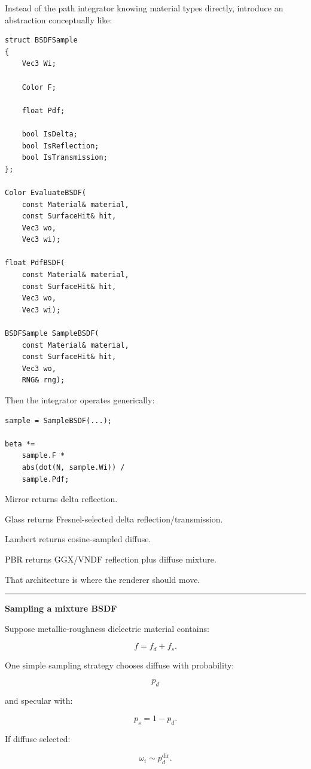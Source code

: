 Instead of the path integrator knowing material types directly, introduce an abstraction conceptually like:

\begin{verbatim}
struct BSDFSample
{
    Vec3 Wi;

    Color F;

    float Pdf;

    bool IsDelta;
    bool IsReflection;
    bool IsTransmission;
};

Color EvaluateBSDF(
    const Material& material,
    const SurfaceHit& hit,
    Vec3 wo,
    Vec3 wi);

float PdfBSDF(
    const Material& material,
    const SurfaceHit& hit,
    Vec3 wo,
    Vec3 wi);

BSDFSample SampleBSDF(
    const Material& material,
    const SurfaceHit& hit,
    Vec3 wo,
    RNG& rng);
\end{verbatim}

Then the integrator operates generically:

\begin{verbatim}
sample = SampleBSDF(...);

beta *=
    sample.F *
    abs(dot(N, sample.Wi)) /
    sample.Pdf;
\end{verbatim}

Mirror returns delta reflection.

Glass returns Fresnel-selected delta reflection/transmission.

Lambert returns cosine-sampled diffuse.

PBR returns GGX/VNDF reflection plus diffuse mixture.

That architecture is where the renderer should move.

\begin{center}\rule{0.5\linewidth}{0.5pt}\end{center}

\textbf{Sampling a mixture BSDF}

Suppose metallic-roughness dielectric material contains:

\[
f=
f_d+f_s.
\]

One simple sampling strategy chooses diffuse with probability:

\[
p_d
\]

and specular with:

\[
p_s=1-p_d.
\]

If diffuse selected:

\[
\omega_i\sim p_d^{\text{dir}}.
\]

